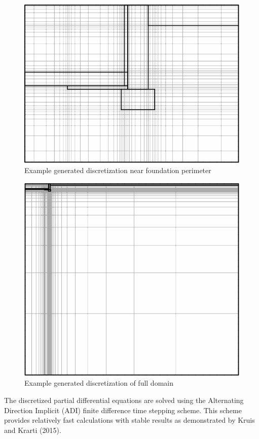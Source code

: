 \begin{figure}
\centering
\includegraphics{media/kiva-2d-mesh.png}
\caption{Example generated discretization near foundation
perimeter\label{fig:ms}}
\end{figure}

\begin{figure}
\centering
\includegraphics{media/kiva-2d-mesh-big.png}
\caption{Example generated discretization of full domain\label{fig:mb}}
\end{figure}

The discretized partial differential equations are solved using the
Alternating Direction Implicit (ADI) finite difference time stepping
scheme. This scheme provides relatively fast calculations with stable
results as demonstrated by Kruis and Krarti (2015).

